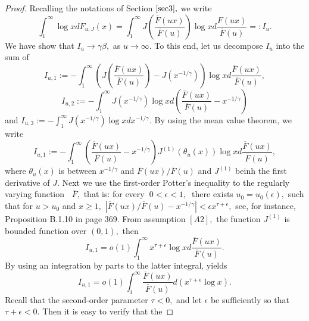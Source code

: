 \documentclass[12pt,reqno,openbib,runningheads,a4paper,portrait]{amsart}%
\begin{document}
\begin{proof}
Recalling the notations of Section $\ref{sec3},$ we write%
\[
\int_{1}^{\infty}\log xdF_{u,J}\left(  x\right)  =\int_{1}^{\infty}J\left(
\frac{\overline{F}\left(  ux\right)  }{\overline{F}\left(  u\right)  }\right)
\log xd\frac{F\left(  ux\right)  }{\overline{F}\left(  u\right)  }=:I_{u}.
\]
We have show that $I_{u}\rightarrow\gamma\beta,$ as $u\rightarrow\infty. $ To
this end, let us decompose $I_{u}$ into the sum of
\[
I_{u,1}:=-\int_{1}^{\infty}\left(  J\left(  \frac{\overline{F}\left(
ux\right)  }{\overline{F}\left(  u\right)  }\right)  -J\left(  x^{-1/\gamma
}\right)  \right)  \log xd\frac{\overline{F}\left(  ux\right)  }{\overline
{F}\left(  u\right)  },
\]%
\[
I_{u,2}:=-\int_{1}^{\infty}J\left(  x^{-1/\gamma}\right)  \log xd\left(
\frac{\overline{F}\left(  ux\right)  }{\overline{F}\left(  u\right)
}-x^{-1/\gamma}\right)
\]
and $I_{u,3}:=-\int_{1}^{\infty}J\left(  x^{-1/\gamma}\right)  \log
xdx^{-1/\gamma}.$ By using the mean value theorem, we write%
\[
I_{u,1}:=-\int_{1}^{\infty}\left(  \frac{\overline{F}\left(  ux\right)
}{\overline{F}\left(  u\right)  }-x^{-1/\gamma}\right)  J^{\left(  1\right)
}\left(  \theta_{u}\left(  x\right)  \right)  \log xd\frac{\overline{F}\left(
ux\right)  }{\overline{F}\left(  u\right)  },
\]
where $\theta_{u}\left(  x\right)  $ is between $x^{-1/\gamma}$ and
$\overline{F}\left(  ux\right)  /\overline{F}\left(  u\right)  $ and
$J^{\left(  1\right)  }$ beinh the first derivative of $J$. Next we use the
first-order Potter's inequality to the regularly varying function\textbf{\ }%
$\overline{F},$ that is: for every\textbf{\ }$0<\epsilon<1,$\textbf{\ }there
exists $u_{0}=u_{0}\left(  \epsilon\right)  ,$ such that for $u>u_{0}$ and
$x\geq1,$ $\left\vert \overline{F}\left(  ux\right)  /\overline{F}\left(
u\right)  -x^{-1/\gamma}\right\vert <\epsilon x^{\tau+\epsilon},$ see, for
instance, Proposition B.1.10 in \cite{deHF06} page 369. From assumption
$\left[  A2\right]  ,$ the function $J^{\left(  1\right)  }$ is bounded
function over $\left(  0,1\right)  ,$ then%
\[
I_{u,1}=o\left(  1\right)  \int_{1}^{\infty}x^{\tau+\epsilon}\log
xd\frac{\overline{F}\left(  ux\right)  }{\overline{F}\left(  u\right)  }.
\]
By using an integration by parts to the latter integral, yields%
\[
I_{u,1}=o\left(  1\right)  \int_{1}^{\infty}\frac{\overline{F}\left(
ux\right)  }{\overline{F}\left(  u\right)  }d\left(  x^{\tau+\epsilon}\log
x\right)  .
\]
Recall that the second-order parameter $\tau<0,$ and let $\epsilon$ be
sufficiently so that $\tau+\epsilon<0.$ Then it is easy to verify that the

\end{proof}
\end{document}
